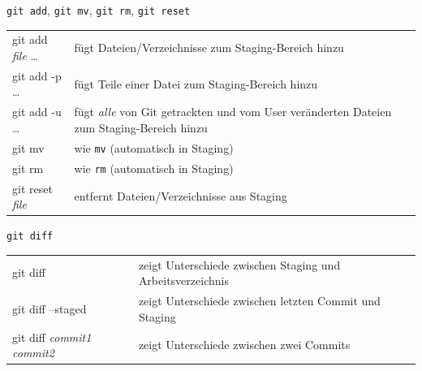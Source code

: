 \begin{frame}{\texttt{git add}, \texttt{git mv}, \texttt{git rm}, \texttt{git reset}}
  \begin{tabu}{>{\ttfamily}l X[,L]}
    git add \textit{file} … & fügt Dateien/Verzeichnisse zum Staging-Bereich hinzu \\
    git add -p …            & fügt Teile einer Datei zum Staging-Bereich hinzu \\
    git add -u …            & fügt \emph{alle} von Git getrackten und vom User veränderten Dateien zum Staging-Bereich hinzu\\
    git mv                  & wie \texttt{mv} (automatisch in Staging)\\
    git rm                  & wie \texttt{rm} (automatisch in Staging) \\
    git reset \textit{file} & entfernt Dateien/Verzeichnisse aus Staging
  \end{tabu}
\end{frame}

\begin{frame}{\texttt{git diff}}
  \begin{tabu}{>{\ttfamily}l X[,L]}
    git diff                                   & zeigt Unterschiede zwischen Staging und Arbeitsverzeichnis \\
    git diff --staged                          & zeigt Unterschiede zwischen letzten Commit und Staging \\
    git diff \textit{commit1} \textit{commit2} & zeigt Unterschiede zwischen zwei Commits
  \end{tabu}
\end{frame}

